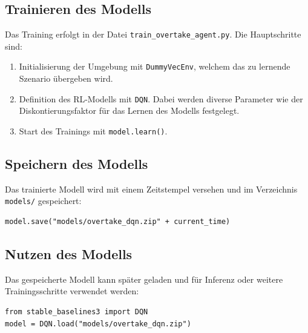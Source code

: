 \subsection{Trainieren des Modells}
Das Training erfolgt in der Datei \texttt{train\_overtake\_agent.py}. Die Hauptschritte sind:
\begin{enumerate}
    \item Initialisierung der Umgebung mit \texttt{DummyVecEnv}, welchem das zu lernende Szenario übergeben wird.
    \item Definition des RL-Modells mit \texttt{DQN}. Dabei werden diverse Parameter wie der Diskontierungsfaktor für das Lernen des Modells festgelegt.
    \item Start des Trainings mit \texttt{model.learn()}.
\end{enumerate}

\subsection{Speichern des Modells}
Das trainierte Modell wird mit einem Zeitstempel versehen und im Verzeichnis \texttt{models/} gespeichert:
\begin{lstlisting}
model.save("models/overtake_dqn.zip" + current_time)
\end{lstlisting}

\subsection{Nutzen des Modells}
Das gespeicherte Modell kann später geladen und für Inferenz oder weitere Trainingsschritte verwendet werden:
\begin{lstlisting}
from stable_baselines3 import DQN
model = DQN.load("models/overtake_dqn.zip")
\end{lstlisting}